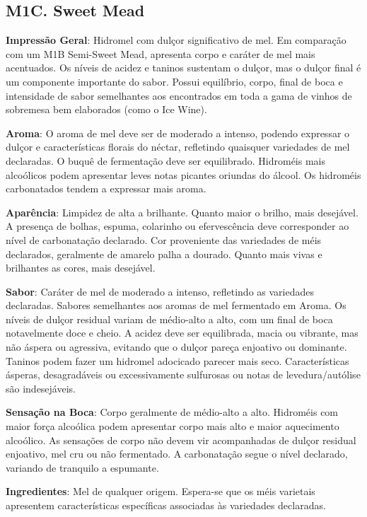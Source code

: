 \subsection*{M1C. Sweet Mead}

\textbf{Impressão Geral}: Hidromel com dulçor significativo de mel. Em comparação com um M1B Semi-Sweet Mead, apresenta corpo e caráter de mel mais acentuados. Os níveis de acidez e taninos sustentam o dulçor, mas o dulçor final é um componente importante do sabor. Possui equilíbrio, corpo, final de boca e intensidade de sabor semelhantes aos encontrados em toda a gama de vinhos de sobremesa bem elaborados (como o Ice Wine).

\textbf{Aroma}: O aroma de mel deve ser de moderado a intenso, podendo expressar o dulçor e características florais do néctar, refletindo quaisquer variedades de mel declaradas. O buquê de fermentação deve ser equilibrado. Hidroméis mais alcoólicos podem apresentar leves notas picantes oriundas do álcool. Os hidroméis carbonatados tendem a expressar mais aroma.

\textbf{Aparência}: Limpidez de alta a brilhante. Quanto maior o brilho, mais desejável. A presença de bolhas, espuma, colarinho ou efervescência deve corresponder ao nível de carbonatação declarado. Cor proveniente das variedades de méis declarados, geralmente de amarelo palha a dourado. Quanto mais vivas e brilhantes as cores, mais desejável.

\textbf{Sabor}: Caráter de mel de moderado a intenso, refletindo as variedades declaradas. Sabores semelhantes aos aromas de mel fermentado em Aroma. Os níveis de dulçor residual variam de médio-alto a alto, com um final de boca notavelmente doce e cheio. A acidez deve ser equilibrada, macia ou vibrante, mas não áspera ou agressiva, evitando que o dulçor pareça enjoativo ou dominante. Taninos podem fazer um hidromel adocicado parecer mais seco. Características ásperas, desagradáveis ou excessivamente sulfurosas ou notas de levedura/autólise são indesejáveis.

\textbf{Sensação na Boca}: Corpo geralmente de médio-alto a alto. Hidroméis com maior força alcoólica podem apresentar corpo mais alto e maior aquecimento alcoólico. As sensações de corpo não devem vir acompanhadas de dulçor residual enjoativo, mel cru ou não fermentado. A carbonatação segue o nível declarado, variando de tranquilo a espumante.

\textbf{Ingredientes}: Mel de qualquer origem. Espera-se que os méis varietais apresentem características específicas associadas às variedades declaradas.

